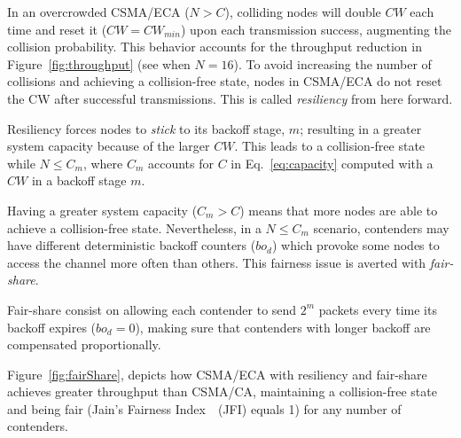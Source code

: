 

In an overcrowded CSMA/ECA ($N>C$), colliding nodes will double $CW$ each time and reset it ($CW=CW_{min}$) upon each transmission success, augmenting the collision probability. This behavior accounts for the throughput reduction in Figure~\ref{fig:throughput} (see when $N=16$). To avoid increasing the number of collisions and achieving a collision-free state, nodes in CSMA/ECA do not reset the CW after successful transmissions. This is called \emph{resiliency} from here forward.

Resiliency forces nodes to \emph{stick} to its backoff stage, $m$; resulting in a greater system capacity because of the larger $CW$. This leads to a collision-free state while $N\leq C_{m}$, where $C_{m}$ accounts for $C$ in Eq.~\ref{eq:capacity} computed with a $CW$ in a backoff stage $m$.

Having a greater system capacity ($C_{m} > C$) means that more nodes are able to achieve a collision-free state. Nevertheless, in a $N\leq C_{m}$ scenario, contenders may have different deterministic backoff counters ($bo_{d}$) which provoke some nodes to access the channel more often than others. This fairness issue is averted with \emph{fair-share}.

Fair-share consist on allowing each contender to send $2^{m}$ packets every time its backoff expires ($bo_{d}=0$), making sure that contenders with longer backoff are compensated proportionally.

Figure~\ref{fig:fairShare}, depicts how CSMA/ECA with resiliency and fair-share achieves greater throughput than CSMA/CA, maintaining a collision-free state and being fair (Jain's Fairness Index~\cite{JFI}~(JFI) equals 1) for any number of contenders.


